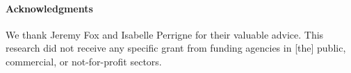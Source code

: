 \documentclass[11pt, a4paper]{article}
\begin{document}
\paragraph{Acknowledgments}
We thank Jeremy Fox and Isabelle Perrigne for their valuable advice. This research did not receive any specific grant from funding agencies in [the] public, commercial, or not-for-profit sectors. 

\newpage




\end{document}

